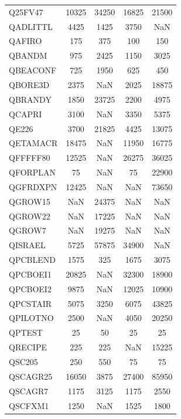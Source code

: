 \begin{longtable}{lcccc}
Q25FV47  &    10325 & 34250 &    16825 &    21500 \\
QADLITTL &     4425 &  1425 &     3750 &      NaN \\
QAFIRO   &      175 &   375 &      100 &      150 \\
QBANDM   &      975 &  2425 &     1150 &     3025 \\
QBEACONF &      725 &  1950 &      625 &      450 \\
QBORE3D  &     2375 &   NaN &     2025 &    18875 \\
QBRANDY  &     1850 & 23725 &     2200 &     4975 \\
QCAPRI   &     3100 &   NaN &     3350 &     5375 \\
QE226    &     3700 & 21825 &     4425 &    13075 \\
QETAMACR &    18475 &   NaN &    11950 &    16775 \\
QFFFFF80 &    12525 &   NaN &    26275 &    36025 \\
QFORPLAN &       75 &   NaN &       75 &    22900 \\
QGFRDXPN &    12425 &   NaN &      NaN &    73650 \\
QGROW15  &      NaN & 24375 &      NaN &      NaN \\
QGROW22  &      NaN & 17225 &      NaN &      NaN \\
QGROW7   &      NaN & 19275 &      NaN &      NaN \\
QISRAEL  &     5725 & 57875 &    34900 &      NaN \\
QPCBLEND &     1575 &   325 &     1675 &     3075 \\
QPCBOEI1 &    20825 &   NaN &    32300 &    18900 \\
QPCBOEI2 &     9875 &   NaN &    12025 &    10900 \\
QPCSTAIR &     5075 &  3250 &     6075 &    43825 \\
QPILOTNO &     2500 &   NaN &     4050 &    20250 \\
QPTEST   &       25 &    50 &       25 &       25 \\
QRECIPE  &      225 &   225 &      NaN &    15225 \\
QSC205   &      250 &   550 &       75 &       75 \\
QSCAGR25 &    16050 &  3875 &    27400 &    85950 \\
QSCAGR7  &     1175 &  3125 &     1175 &     2550 \\
QSCFXM1  &     1250 &   NaN &     1525 &     1800 \\

\end{longtable}

